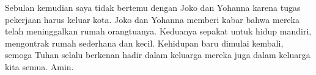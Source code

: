 Sebulan kemudian saya tidak bertemu dengan Joko dan Yohanna karena tugas pekerjaan harus keluar kota. Joko dan Yohanna memberi kabar bahwa mereka telah meninggalkan rumah orangtuanya. Keduanya sepakat untuk hidup mandiri, mengontrak rumah sederhana dan kecil. Kehidupan baru dimulai kembali, semoga Tuhan selalu berkenan hadir dalam keluarga mereka juga dalam  keluarga kita semua. Amin.

